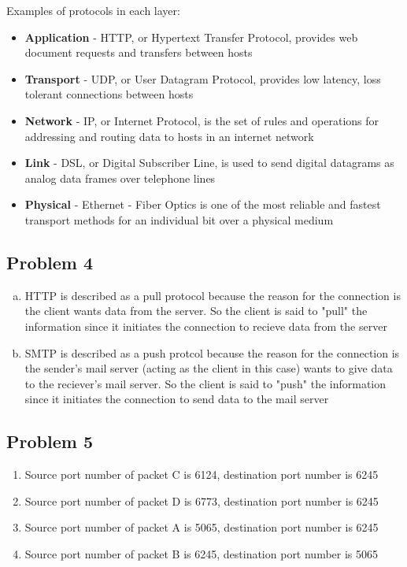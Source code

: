 \documentclass[14pt]{article}
\newcommand{\bd}{\textbf}
\begin{document}
Examples of protocols in each layer: 
\begin{itemize}
\item \bd{Application} - HTTP, or Hypertext Transfer Protocol, provides web document requests and transfers between hosts
\item \bd{Transport} - UDP, or User Datagram Protocol, provides low latency, loss tolerant connections between hosts
\item \bd{Network} - IP, or Internet Protocol, is the set of rules and operations for addressing and routing data to hosts in an internet network
\item \bd{Link} - DSL, or Digital Subscriber Line, is used to send digital datagrams as analog data frames over telephone lines
\item \bd{Physical} - Ethernet - Fiber Optics is one of the most reliable and fastest transport methods for an individual bit over a physical medium
\end{itemize}

\pagebreak

\subsection*{Problem 4}
\begin{enumerate}[a)]
\item HTTP is described as a pull protocol because the reason for the connection is the client wants data from the server. So the client is said to "pull" the information since it initiates the connection to recieve data from the server
\item SMTP is described as a push protcol because the reason for the connection is the sender's mail server (acting as the client in this case) wants to give data to the reciever's mail server. So the client is said to "push" the information since it initiates the connection to send data to the mail server
\end{enumerate}

\subsection*{Problem 5}
\begin{enumerate}
\item Source port number of packet C is 6124, destination port number is 6245
\item Source port number of packet D is 6773, destination port number is 6245
\item Source port number of packet A is 5065, destination port number is 6245
\item Source port number of packet B is 6245, destination port number is 5065
\end{enumerate}
\end{document}
